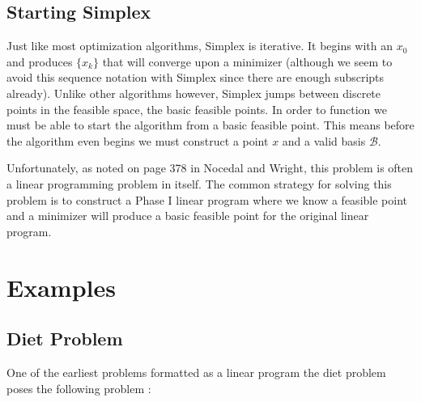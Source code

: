 \documentclass[12pt]{amsart}
\begin{document}
\subsection{Starting Simplex}

Just like most optimization algorithms, Simplex is iterative. It begins with an
$x_0$ and produces $\{x_k\}$ that will converge upon a minimizer (although we
seem to avoid this sequence notation with Simplex since there are enough
subscripts already). Unlike other algorithms however, Simplex jumps between
discrete points in the feasible space, the basic feasible points. In order to
function we must be able to start the algorithm from a basic feasible point.
This means before the algorithm even begins we must construct a point $x$ and
a valid basis $\mathcal{B}$.

Unfortunately, as noted on page 378 in Nocedal and Wright, this problem is often
a linear programming problem in itself. The common strategy for solving this
problem is to construct a Phase I linear program where we know a feasible point
and a minimizer will produce a basic feasible point for the original linear
program.

\section{Examples}

\subsection{Diet Problem}

One of the earliest problems formatted as a linear program the diet problem
poses the following problem \cite{steiglitz}:
\end{document}
